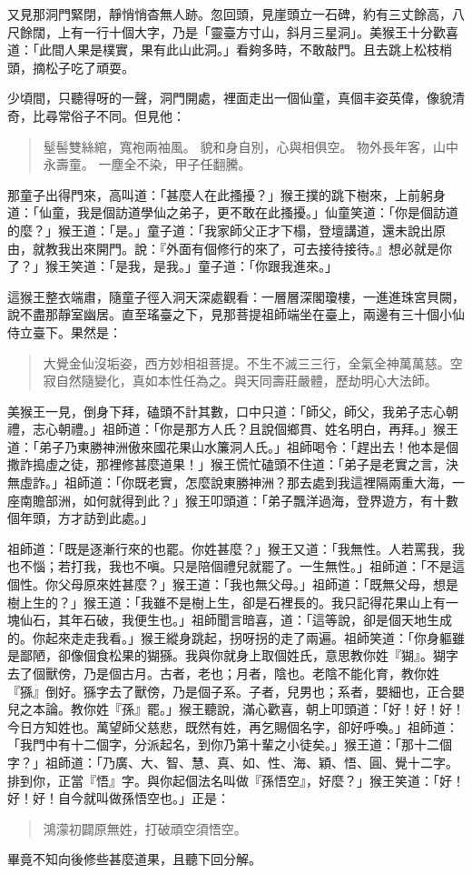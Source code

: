 又見那洞門緊閉，靜悄悄杳無人跡。忽回頭，見崖頭立一石碑，約有三丈餘高，八尺餘闊，上有一行十個大字，乃是「靈臺方寸山，斜月三星洞」。美猴王十分歡喜道：「此間人果是樸實，果有此山此洞。」看夠多時，不敢敲門。且去跳上松枝梢頭，摘松子吃了頑耍。

少頃間，只聽得呀的一聲，洞門開處，裡面走出一個仙童，真個丰姿英偉，像貌清奇，比尋常俗子不同。但見他：
\begin{quote}
髽髻雙絲綰，寬袍兩袖風。
貌和身自別，心與相俱空。
物外長年客，山中永壽童。
一塵全不染，甲子任翻騰。
\end{quote}

那童子出得門來，高叫道：「甚麼人在此搔擾？」猴王撲的跳下樹來，上前躬身道：「仙童，我是個訪道學仙之弟子，更不敢在此搔擾。」仙童笑道：「你是個訪道的麼？」猴王道：「是。」童子道：「我家師父正才下榻，登壇講道，還未說出原由，就教我出來開門。說：『外面有個修行的來了，可去接待接待。』想必就是你了？」猴王笑道：「是我，是我。」童子道：「你跟我進來。」

這猴王整衣端肅，隨童子徑入洞天深處觀看：一層層深閣瓊樓，一進進珠宮貝闕，說不盡那靜室幽居。直至瑤臺之下，見那菩提祖師端坐在臺上，兩邊有三十個小仙侍立臺下。果然是：
\begin{quote}
大覺金仙沒垢姿，西方妙相祖菩提。不生不滅三三行，全氣全神萬萬慈。空寂自然隨變化，真如本性任為之。與天同壽莊嚴體，歷劫明心大法師。
\end{quote}

美猴王一見，倒身下拜，磕頭不計其數，口中只道：「師父，師父，我弟子志心朝禮，志心朝禮。」祖師道：「你是那方人氏？且說個鄉貫、姓名明白，再拜。」猴王道：「弟子乃東勝神洲傲來國花果山水簾洞人氏。」祖師喝令：「趕出去！他本是個撒詐搗虛之徒，那裡修甚麼道果！」猴王慌忙磕頭不住道：「弟子是老實之言，決無虛詐。」祖師道：「你既老實，怎麼說東勝神洲？那去處到我這裡隔兩重大海，一座南贍部洲，如何就得到此？」猴王叩頭道：「弟子飄洋過海，登界遊方，有十數個年頭，方才訪到此處。」

祖師道：「既是逐漸行來的也罷。你姓甚麼？」猴王又道：「我無性。人若罵我，我也不惱；若打我，我也不嗔。只是陪個禮兒就罷了。一生無性。」祖師道：「不是這個性。你父母原來姓甚麼？」猴王道：「我也無父母。」祖師道：「既無父母，想是樹上生的？」猴王道：「我雖不是樹上生，卻是石裡長的。我只記得花果山上有一塊仙石，其年石破，我便生也。」祖師聞言暗喜，道：「這等說，卻是個天地生成的。你起來走走我看。」猴王縱身跳起，拐呀拐的走了兩遍。祖師笑道：「你身軀雖是鄙陋，卻像個食松果的猢猻。我與你就身上取個姓氏，意思教你姓『猢』。猢字去了個獸傍，乃是個古月。古者，老也；月者，陰也。老陰不能化育，教你姓『猻』倒好。猻字去了獸傍，乃是個子系。子者，兒男也；系者，嬰細也，正合嬰兒之本論。教你姓『孫』罷。」猴王聽說，滿心歡喜，朝上叩頭道：「好！好！好！今日方知姓也。萬望師父慈悲，既然有姓，再乞賜個名字，卻好呼喚。」祖師道：「我門中有十二個字，分派起名，到你乃第十輩之小徒矣。」猴王道：「那十二個字？」祖師道：「乃廣、大、智、慧、真、如、性、海、穎、悟、圓、覺十二字。排到你，正當『悟』字。與你起個法名叫做『孫悟空』，好麼？」猴王笑道：「好！好！好！自今就叫做孫悟空也。」正是：
\begin{quote}
鴻濛初闢原無姓，打破頑空須悟空。
\end{quote}

畢竟不知向後修些甚麼道果，且聽下回分解。
